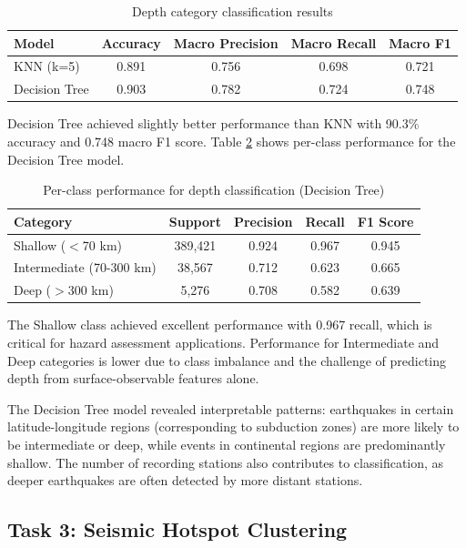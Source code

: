 \begin{table}[H]
\centering
\caption{Depth category classification results}
\label{tab:depth_classification_results}
\begin{tabular}{|l|c|c|c|c|}
\hline
\textbf{Model} & \textbf{Accuracy} & \textbf{Macro Precision} & \textbf{Macro Recall} & \textbf{Macro F1} \\
\hline
KNN (k=5) & 0.891 & 0.756 & 0.698 & 0.721 \\
Decision Tree & 0.903 & 0.782 & 0.724 & 0.748 \\
\hline
\end{tabular}
\end{table}

Decision Tree achieved slightly better performance than KNN with 90.3\% accuracy and 0.748 macro F1 score. Table \ref{tab:depth_perclass} shows per-class performance for the Decision Tree model.

\begin{table}[H]
\centering
\caption{Per-class performance for depth classification (Decision Tree)}
\label{tab:depth_perclass}
\begin{tabular}{|l|c|c|c|c|}
\hline
\textbf{Category} & \textbf{Support} & \textbf{Precision} & \textbf{Recall} & \textbf{F1 Score} \\
\hline
Shallow ($<$70 km) & 389,421 & 0.924 & 0.967 & 0.945 \\
Intermediate (70-300 km) & 38,567 & 0.712 & 0.623 & 0.665 \\
Deep ($>$300 km) & 5,276 & 0.708 & 0.582 & 0.639 \\
\hline
\end{tabular}
\end{table}

The Shallow class achieved excellent performance with 0.967 recall, which is critical for hazard assessment applications. Performance for Intermediate and Deep categories is lower due to class imbalance and the challenge of predicting depth from surface-observable features alone.

The Decision Tree model revealed interpretable patterns: earthquakes in certain latitude-longitude regions (corresponding to subduction zones) are more likely to be intermediate or deep, while events in continental regions are predominantly shallow. The number of recording stations also contributes to classification, as deeper earthquakes are often detected by more distant stations.

\subsection{Task 3: Seismic Hotspot Clustering}

